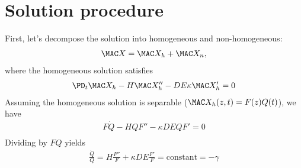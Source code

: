 \documentclass[11pt]{article}
\begin{document}
\section{Solution procedure}
First, let's decompose the solution into homogeneous and non-homogeneous:
\begin{equation}\begin{aligned}
	\MAC X = \MAC X_h + \MAC X_n, \\
\end{aligned} \end{equation}
where the homogeneous solution satisfies
\begin{equation}\begin{aligned}
	\PD_t \MAC X_h - H \MAC X_h'' - DE \kappa \MAC X_h'  = 0 \\
\end{aligned} \end{equation}
Assuming the homogeneous solution is separable ($\MAC X_h(z,t) = F(z)Q(t)$), we have
\begin{equation}\begin{aligned}
	F\dot{Q} - HQF'' - \kappa DEQF' = 0 \\
\end{aligned} \end{equation}
Dividing by $FQ$ yields
\begin{equation}\begin{aligned}
	\frac{\dot{Q}}{Q} = H \frac{F''}{F} + \kappa DE \frac{F'}{F} = \text{constant} = -\gamma \\
\end{aligned} \end{equation}
\end{document}
